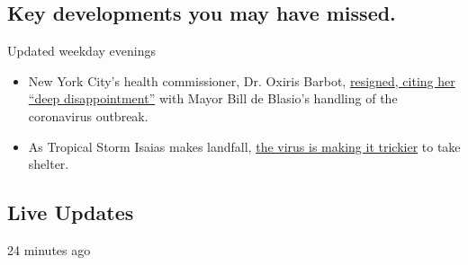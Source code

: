 \hypertarget{key-developments-you-may-have-missed}{%
\subsection{Key developments you may have
missed.}\label{key-developments-you-may-have-missed}}

Updated weekday evenings

\begin{itemize}
\tightlist
\item
  New York City's health commissioner, Dr. Oxiris Barbot,
  \href{https://www.nytimes3xbfgragh.onion/2020/08/04/nyregion/oxiris-barbot-health-commissioner-resigns.html}{resigned,
  citing her ``deep disappointment''} with Mayor Bill de Blasio's
  handling of the coronavirus outbreak.
\item
  As Tropical Storm Isaias makes landfall,
  \href{https://www.nytimes3xbfgragh.onion/2020/08/04/world/coronavirus-cases.html}{the
  virus is making it trickier} to take shelter.
\end{itemize}

\hypertarget{live-updates}{%
\subsection{Live Updates}\label{live-updates}}

24 minutes ago

